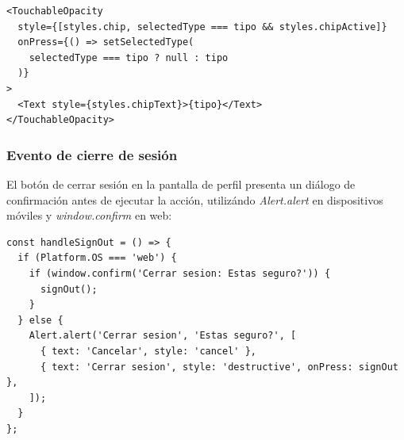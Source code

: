 \begin{lstlisting}
<TouchableOpacity
  style={[styles.chip, selectedType === tipo && styles.chipActive]}
  onPress={() => setSelectedType(
    selectedType === tipo ? null : tipo
  )}
>
  <Text style={styles.chipText}>{tipo}</Text>
</TouchableOpacity>
\end{lstlisting}

\subsubsection{Evento de cierre de sesi\'on}

El bot\'on de cerrar sesi\'on en la pantalla de perfil presenta un
di\'alogo de confirmaci\'on antes de ejecutar la acci\'on, utiliz\'ando
\textit{Alert.alert} en dispositivos m\'oviles y \textit{window.confirm}
en web:

\begin{lstlisting}
const handleSignOut = () => {
  if (Platform.OS === 'web') {
    if (window.confirm('Cerrar sesion: Estas seguro?')) {
      signOut();
    }
  } else {
    Alert.alert('Cerrar sesion', 'Estas seguro?', [
      { text: 'Cancelar', style: 'cancel' },
      { text: 'Cerrar sesion', style: 'destructive', onPress: signOut },
    ]);
  }
};
\end{lstlisting}

